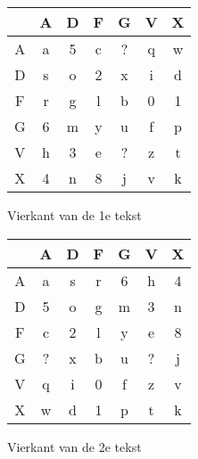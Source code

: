 \begin{figure}[h!]
   \begin{minipage}{0.45\textwidth}
		\begin{tabular}{c || c | c | c | c | c | c |}
		&A&D&F&G&V&X\\	\hline\hline
		A&a&5&c&?&q&w\\ \hline
		D&s&o&2&x&i&d\\ \hline
		F&r&g&l&b&0&1\\ \hline
		G&6&m&y&u&f&p\\ \hline
		V&h&3&e&?&z&t\\ \hline
		X&4&n&8&j&v&k\\ \hline
		\end{tabular}
		\caption{Vierkant van de 1e tekst }
    \end{minipage}
      \hspace{0.5cm}
   \begin{minipage}{0.45\textwidth}
		\begin{tabular}{c || c | c | c | c | c | c |}
		&A&D&F&G&V&X\\	\hline\hline
		A&a&s&r&6&h&4\\ \hline
		D&5&o&g&m&3&n\\ \hline
		F&c&2&l&y&e&8\\ \hline
		G&?&x&b&u&?&j\\ \hline
		V&q&i&0&f&z&v\\ \hline
		X&w&d&1&p&t&k\\ \hline
		\end{tabular}
		\caption{Vierkant van de 2e tekst }
    \end{minipage}
\end{figure}


